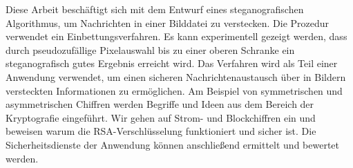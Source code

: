 \newenvironment{abstractpage}
{\cleardoublepage\vspace*{\fill}\thispagestyle{empty}}
{\vfill\cleardoublepage}
\newenvironment{myabstract}[1]
{\bigskip\selectlanguage{#1}
  \begin{center}
    \bfseries\abstractname
  \end{center}}
{\par\bigskip}

\begin{abstractpage}
  \begin{myabstract}{german}
    Diese Arbeit beschäftigt sich mit dem Entwurf eines steganografischen Algorithmus, um
    Nachrichten in einer Bilddatei zu verstecken.
    Die Prozedur verwendet ein  Einbettungsverfahren. Es
    kann experimentell gezeigt werden, dass durch pseudozufällige
    Pixelauswahl bis zu einer oberen Schranke ein
    steganografisch gutes Ergebnis erreicht wird.
    Das Verfahren wird als Teil einer Anwendung verwendet,
    um einen sicheren Nachrichtenaustausch über in Bildern versteckten
    Informationen zu ermöglichen. Am Beispiel von
    symmetrischen und asymmetrischen Chiffren werden Begriffe und Ideen
    aus dem Bereich der Kryptografie eingeführt. Wir gehen auf
    Strom- und Blockchiffren ein und beweisen warum die
    RSA-Verschlüsselung funktioniert und sicher ist.
    Die Sicherheitsdienste der Anwendung können anschließend ermittelt
    und bewertet werden.
  \end{myabstract}
  \begin{myabstract}{english}

  \end{myabstract}
\end{abstractpage}